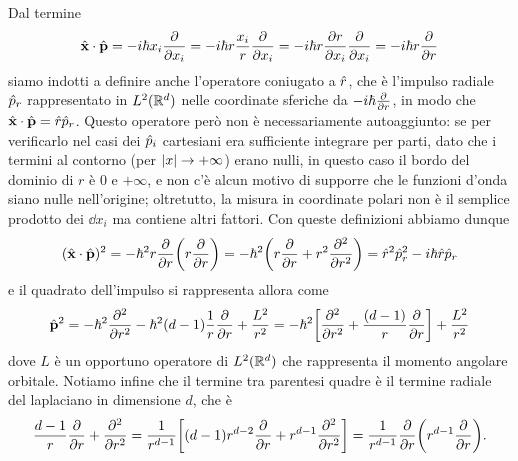 Dal termine
\begin{equation}
	\scalar{\op{\vec x}}{\op{\vec p}}=-i\hbar x_i\drp{}{x_i}=-i\hbar r\frac{x_i}{r}\drp{}{x_i}=-i\hbar r\drp{r}{x_i}\drp{}{x_i}=-i\hbar r\drp{}{r}
\end{equation}
siamo indotti a definire anche l'operatore coniugato a $\op r$, che è l'impulso radiale $\op p_r$ rappresentato in $\leb[2]{\R^d}$ nelle coordinate sferiche da $-i\hbar\drp{}{r}$, in modo che $\scalar{\op{\vec x}}{\op{\vec p}}=\op r\op p_r$.
Questo operatore però non è necessariamente autoaggiunto: se per verificarlo nel casi dei $\op p_i$ cartesiani era sufficiente integrare per parti, dato che i termini al contorno (per $\abs{x}\to+\infty$) erano nulli, in questo caso il bordo del dominio di $r$ è $0$ e $+\infty$, e non c'è alcun motivo di supporre che le funzioni d'onda siano nulle nell'origine; oltretutto, la misura in coordinate polari non è il semplice prodotto dei $\dd x_i$ ma contiene altri fattori.
Con queste definizioni abbiamo dunque
\begin{equation}
	(\scalar{\op{\vec x}}{\op{\vec p}})^2=-\hbar^2r\drp{}{r}\bigg(r\drp{}{r}\bigg)=-\hbar^2\bigg(r\drp{}{r}+r^2\ddrp{}{r}\bigg)=\op r^2\op p_r^2-i\hbar \op r\op p_r
\end{equation}
e il quadrato dell'impulso si rappresenta allora come
\begin{equation}
	\op{\vec p}^2=-\hbar^2\ddrp{}{r}-\hbar^2(d-1)\frac1{r}\drp{}{r}+\frac{L^2}{r^2}=
	-\hbar^2\bigg[\ddrp{}{r}+\frac{(d-1)}{r}\drp{}{r}\bigg]+\frac{L^2}{r^2}
	\label{eq:rappresentazione-impulso-coordinate-sferiche}
\end{equation}
dove $L$ è un opportuno operatore di $\leb[2]{\R^d}$ che rappresenta il momento angolare orbitale.
Notiamo infine che il termine tra parentesi quadre è il termine radiale del laplaciano in dimensione $d$, che è
\begin{equation}
	\frac{d-1}{r}\drp{}{r}+\ddrp{}{r}=\frac1{r^{d-1}}\bigg[(d-1)r^{d-2}\drp{}{r}+r^{d-1}\ddrp{}{r}\bigg]=\frac1{r^{d-1}}\drp{}{r}\bigg(r^{d-1}\drp{}{r}\bigg).
	\label{eq:laplaciano-dimensione-generica}
\end{equation}

